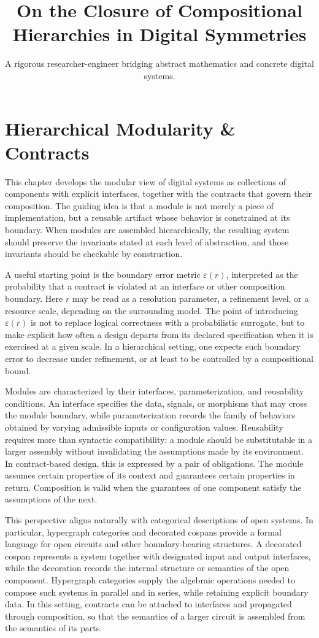 \documentclass[11pt]{article}
\title{On the Closure of Compositional Hierarchies in Digital Symmetries}
\author{A rigorous researcher-engineer bridging abstract mathematics and concrete digital systems.}
\begin{document}
\section*{Hierarchical Modularity \& Contracts}

This chapter develops the modular view of digital systems as collections of components with explicit interfaces, together with the contracts that govern their composition. The guiding idea is that a module is not merely a piece of implementation, but a reusable artifact whose behavior is constrained at its boundary. When modules are assembled hierarchically, the resulting system should preserve the invariants stated at each level of abstraction, and those invariants should be checkable by construction.

A useful starting point is the boundary error metric \(\varepsilon(r)\), interpreted as the probability that a contract is violated at an interface or other composition boundary. Here \(r\) may be read as a resolution parameter, a refinement level, or a resource scale, depending on the surrounding model. The point of introducing \(\varepsilon(r)\) is not to replace logical correctness with a probabilistic surrogate, but to make explicit how often a design departs from its declared specification when it is exercised at a given scale. In a hierarchical setting, one expects such boundary error to decrease under refinement, or at least to be controlled by a compositional bound.

Modules are characterized by their interfaces, parameterization, and reusability conditions. An interface specifies the data, signals, or morphisms that may cross the module boundary, while parameterization records the family of behaviors obtained by varying admissible inputs or configuration values. Reusability requires more than syntactic compatibility: a module should be substitutable in a larger assembly without invalidating the assumptions made by its environment. In contract-based design, this is expressed by a pair of obligations. The module assumes certain properties of its context and guarantees certain properties in return. Composition is valid when the guarantees of one component satisfy the assumptions of the next.

This perspective aligns naturally with categorical descriptions of open systems. In particular, hypergraph categories and decorated cospans provide a formal language for open circuits and other boundary-bearing structures. A decorated cospan represents a system together with designated input and output interfaces, while the decoration records the internal structure or semantics of the open component. Hypergraph categories supply the algebraic operations needed to compose such systems in parallel and in series, while retaining explicit boundary data. In this setting, contracts can be attached to interfaces and propagated through composition, so that the semantics of a larger circuit is assembled from the semantics of its parts.
\end{document}
